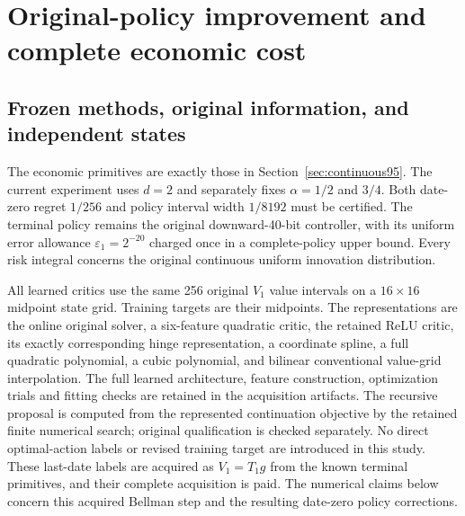 \section{Original-policy improvement and complete economic cost}
\label{sec:study120}

\subsection{Frozen methods, original information, and independent states}
The economic primitives are exactly those in Section~\ref{sec:continuous95}.
The current experiment uses $d=2$ and separately fixes $\alpha=1/2$ and $3/4$.
Both date-zero regret $1/256$ and policy interval width $1/8192$ must be certified.
The terminal policy remains the original downward-40-bit controller, with its
uniform error allowance $\varepsilon_1=2^{-20}$ charged once in a complete-policy
upper bound. Every risk integral concerns the original continuous uniform
innovation distribution.

All learned critics use the same 256 original $V_1$ value intervals on a
$16\times16$ midpoint state grid. Training targets are their midpoints. The
representations are the online original solver, a six-feature quadratic critic,
the retained ReLU critic, its exactly corresponding hinge representation,
a coordinate spline, a full quadratic polynomial, a cubic polynomial, and
bilinear conventional value-grid interpolation. The full learned architecture,
feature construction, optimization trials and fitting checks are retained in
the acquisition artifacts. The recursive proposal is computed from the
represented continuation objective by the retained finite numerical search;
original qualification is checked separately. No direct optimal-action labels or revised training
target are introduced in this study. These last-date labels are acquired as
$V_1=T_1g$ from the known terminal primitives, and their complete acquisition
is paid. The numerical claims below concern this acquired Bellman step and the
resulting date-zero policy corrections.

